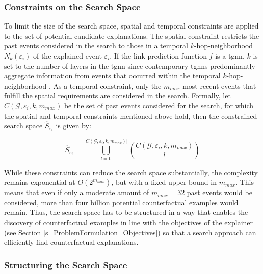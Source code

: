 \subsubsection{Constraints on the Search Space}
\label{s_Methodology_SearchSpace_Constraints}
To limit the size of the search space, spatial and temporal constraints are applied to the set of potential candidate explanations. The spatial constraint restricts the past events considered in the search to those in a temporal $k$-hop-neighborhood $N_k(\varepsilon_i)$ of the explained event $\varepsilon_i$. If the link prediction function $f$ is a \gls{tgnn}, $k$ is set to the number of layers in the \gls{tgnn} since contemporary \glspl{tgnn} predominantly aggregate information from events that occurred within the temporal $k$-hop-neighborhood \cite{yuan_explainability_2021}. As a temporal constraint, only the $m_{max}$ most recent events that fulfill the spatial requirements are considered in the search. Formally, let $C(\mathcal{G}, \varepsilon_i, k, m_{max})$ be the set of past events considered for the search, for which the spatial and temporal constraints mentioned above hold, then the constrained search space $\hat{S}_{\varepsilon_i}$ is given by:

\begin{equation}
    \hat{S}_{\varepsilon_i} = \bigcup_{l = 0}^{|C(\mathcal{G}, \varepsilon_i, k, m_{max})|} {C(\mathcal{G}, \varepsilon_i, k, m_{max}) \choose l}
\end{equation}

While these constraints can reduce the search space substantially, the complexity remains exponential at $O(2^{m_{max}})$, but with a fixed upper bound in $m_{max}$. This means that even if only a moderate amount of $m_{max} = 32$ past events would be considered, more than four billion potential counterfactual examples would remain. Thus, the search space has to be structured in a way that enables the discovery of counterfactual examples in line with the objectives of the explainer (see Section \ref{s_ProblemFormulation_Objectives}) so that a search approach can efficiently find counterfactual explanations.


\subsubsection{Structuring the Search Space}
\label{s_Methodology_SearchSpace_Structure}

